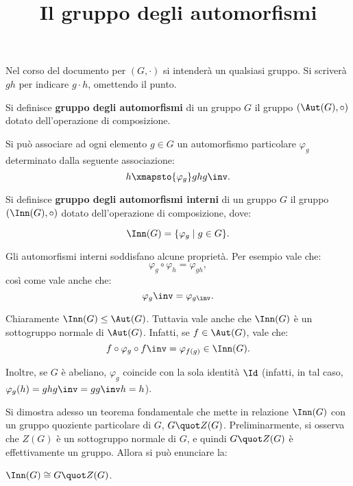 \documentclass[12pt]{scrartcl}
\begin{document}
	\title{Il gruppo degli automorfismi}
	\maketitle

	\begin{note}
		Nel corso del documento per $(G, \cdot)$ si intenderà un qualsiasi gruppo.
		Si scriverà $gh$ per indicare $g \cdot h$, omettendo il punto.
	\end{note}

	\begin{definition}
		Si definisce \textbf{gruppo degli automorfismi} di un gruppo $G$ il
		gruppo $(\Aut(G), \circ)$ dotato dell'operazione di composizione.
	\end{definition} \smallskip

	
	Si può associare ad ogni elemento $g \in G$ un automorfismo particolare $\varphi_g$
	determinato dalla seguente associazione:
	\[ h \xmapsto{\varphi_g} ghg\inv. \]
	
	\begin{definition} Si definisce \textbf{gruppo
		degli automorfismi interni} di un gruppo $G$ il gruppo $(\Inn(G), \circ)$
		dotato dell'operazione di composizione, dove:
		
		\[ \Inn(G) = \{ \varphi_g \mid g \in G \}. \]
	\end{definition}
	
	Gli automorfismi interni soddisfano alcune proprietà. Per esempio vale che:
	\[ \varphi_g \circ \varphi_h = \varphi_{gh}, \]
	così come vale anche che:
	\[ \varphi_g \inv = \varphi_{g\inv}. \] \smallskip


	Chiaramente $\Inn(G) \leq \Aut(G)$. Tuttavia vale anche che $\Inn(G)$ è un sottogruppo
	normale di $\Aut(G)$. Infatti, se $f \in \Aut(G)$, vale che:
	\[ f \circ \varphi_g \circ f\inv = \varphi_{f(g)} \in \Inn(G). \]
	
	Inoltre, se $G$ è abeliano, $\varphi_g$ coincide con la sola identità $\Id$
	(infatti, in tal caso, $\varphi_g(h) = ghg\inv = gg\inv h = h$). \bigskip
	

	Si dimostra adesso un teorema fondamentale che mette in relazione $\Inn(G)$
	con un gruppo quoziente particolare di $G$, $G \quot Z(G)$. Preliminarmente,
	si osserva che $Z(G)$ è un sottogruppo normale di $G$, e quindi
	$G \quot Z(G)$ è effettivamente un gruppo. Allora si può enunciare la:
	
	\begin{proposition}
		$\Inn(G) \cong G \quot Z(G)$.
	\end{proposition}
	
\end{document}
